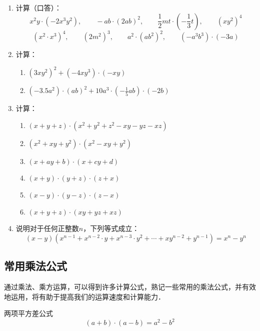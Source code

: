 \begin{ex}
\begin{enumerate}
    \item 计算（口答）：
    \[x^2y\cdot (-2x^3y^2),\qquad -ab\cdot (2ab)^2,\qquad \frac{1}{2}mt\cdot \left(-\frac{1}{3}t\right),\qquad (xy^2)^4 \]
    \[(x^2\cdot x^3)^4,\qquad (2m^2)^3,\qquad a^2\cdot (ab^2)^2,\qquad (-a^3b^3)\cdot (-3a) \]
    \item 计算：
\begin{enumerate}
    \item $(3xy^2)^2+(-4xy^3)\cdot (-xy)$
    \item $(-3.5a^2)\cdot (ab)^2+10a^3\cdot \left(-\frac{1}{5}ab\right)\cdot (-2b)$
\end{enumerate}
\item 计算：
\begin{enumerate}
    \item $(x+y+z)\cdot (x^2+y^2+z^2-xy-yz-xz)$
    \item $(x^2+xy+y^2)\cdot (x^2-xy+y^2)$
    \item $(x+ay+b)\cdot (x+cy+d)$
    \item $(x+y)\cdot (y+z)\cdot(z+x)$
    \item $(x-y)\cdot (y-z)\cdot(z-x)$
    \item $(x+y+z)\cdot (xy+yz+xz)$
\end{enumerate}
\item 说明对于任何正整数$n$，下列等式成立：
\[(x-y)\left(x^{n-1}+x^{n-2}\cdot y+x^{n-3}\cdot y^2+\cdots+xy^{n-2}+y^{n-1}\right)=x^n-y^n \]
\end{enumerate}
\end{ex}    

\subsection{常用乘法公式}

通过乘法、乘方运算，可以得到许多计算公式，熟记一些常用的乘法公式，并有效地运用，将有助于提高我们的运算速度和计算能力．

\begin{blk}{两项平方差公式}
    \begin{equation*}
        (a+b) \cdot (a-b) =a^2-b^2 \tag{I}  
    \end{equation*}
\end{blk}

